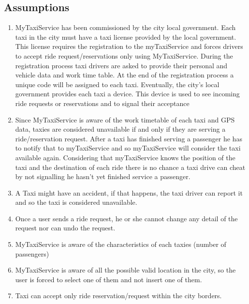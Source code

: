 \documentclass[11pt]{article} %
\begin{document}
    \subsection{Assumptions}
    \begin{enumerate}
        \item MyTaxiService has been commissioned by the city local government.
        Each taxi in the city must have a taxi license provided by the local government. This license requires the registration to the myTaxiService
        and forces drivers to accept ride request/reservations only using MyTaxiService.
        During the registration process taxi drivers are asked to provide their personal and vehicle data and work time table.
        At the end of the registration process a unique code will be assigned to each taxi.
        Eventually, the city's local government provides each taxi a device. This device is used to see incoming ride requests or reservations
        and to signal their acceptance

        \item Since MyTaxiService is aware of the work timetable of each taxi and GPS data, taxies are considered unavailable
        if and only if they are serving a ride/reservation request.  After a taxi has finished serving a passenger he has to notify that
        to myTaxiService and so myTaxiService will consider the taxi available again. Considering that myTaxiService knows the position
        of the taxi and the destination of each ride there is no chance a taxi drive can cheat by not signalling he hasn't yet finished service a passenger.

        \item A Taxi might have an accident, if that happens, the taxi driver can report it and so the taxi
        is considered unavailable.

        \item Once a user sends a ride request, he or she cannot change any detail of the request nor can
          undo the request.

        \item MyTaxiService is aware of the characteristics of each taxies (number of passengers)

        \item MyTaxiService is aware of all the possible valid location in the city, so the user is forced to select one of them and not insert one of them.

        \item Taxi can accept only ride reservation/request within the city borders.


\end{enumerate}
\end{document}
